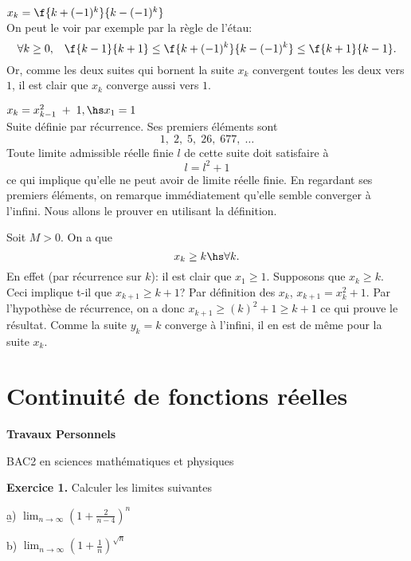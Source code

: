 \vspace{0.5cm}
 $x_k = \f{k+(-1)^k}{k-(-1)^k}$\\

\noindent On peut le voir par exemple par la règle de l'étau:
\[\forall k \geq 0, \;\;\; \f{k-1}{k+1} \leq \f{k+(-1)^k}{k-(-1)^k} \leq \f{k+1}{k-1}. \]
Or, comme les deux suites qui bornent la suite $x_k$ convergent toutes les deux vers $1$, il est clair que $x_k$ converge aussi vers $1$.


\vspace{0.5cm}
 $x_k = x_{k-1}^2\;+\;1,\hs x_1=1$\\

\noindent Suite définie par récurrence. Ses premiers éléments sont \[1, \; 2, \; 5, \;  26, \; 677, \; \ldots\]
Toute  limite admissible réelle finie $l$  de cette suite doit satisfaire à \[l=l^2+1\] ce qui implique qu'elle ne peut avoir de limite réelle finie. En regardant ses premiers éléments, on remarque immédiatement qu'elle semble converger à l'infini. Nous allons le prouver en utilisant la définition.

\noindent Soit $M> 0$. On a que \[x_k \geq k \hs \forall k.\] En effet (par récurrence sur $k$): il est clair que $x_1 \geq 1$. Supposons que $x_k \geq k$. Ceci implique t-il que $x_{k+1}\geq k+1$? Par définition des $x_k$, $x_{k+1} = x_k^2+1$. Par l'hypothèse de récurrence, on a donc $x_{k+1}\geq (k)^2 +1\geq k+1$ ce qui prouve le résultat. Comme la suite $y_k=k$ converge à l'infini, il en est de même pour la suite $x_k$.



\section{Continuité de fonctions réelles}


\begin{center}
\LARGE \bf
Travaux Personnels 
\end{center}

\begin{bf}
\begin{center}
BAC2 en sciences mathématiques et physiques
\end{center}
\end{bf}

{\bf Exercice 1.} Calculer les limites suivantes

\b
a) $\displaystyle \lim_{n \to \infty} \left( 1+ \frac{2}{n-4} \right)^n$

\medskip
b) 
$\displaystyle \lim_{n \to \infty} 
         \left( 1+ \frac 1n \right)^{\sqrt{n}}$

